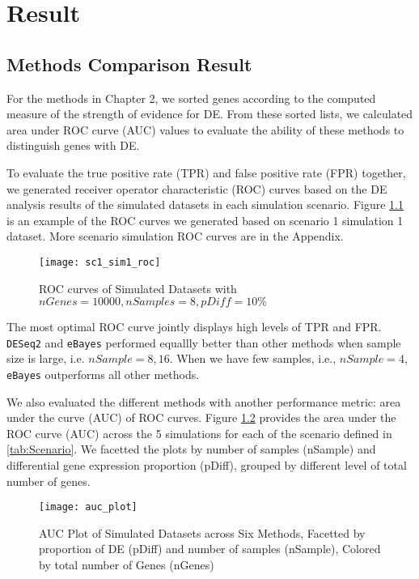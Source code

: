 \chapter{Result}

\section{Methods Comparison Result}

For the methods in Chapter 2, we sorted genes according to the computed measure of the strength of evidence for DE. From these sorted lists, we calculated area under ROC curve (AUC) values to evaluate the ability of these methods to distinguish genes with DE. 

To evaluate the true positive rate (TPR) and false positive rate (FPR) together, we generated receiver operator characteristic (ROC) curves based on the DE analysis results of the simulated datasets in each simulation scenario. Figure \ref{sc1_roc_01} is an example of the ROC curves we generated based on scenario 1 simulation 1 dataset. More scenario simulation ROC curves are in the Appendix. 

\begin{figure}[h!tb] 
\texttt{[image: sc1\_sim1\_roc]}
\caption{ROC curves of Simulated Datasets with $nGenes=10000, nSamples=8, pDiff=10\%$}
\label{sc1_roc_01}
\end{figure}

The most optimal ROC curve jointly displays high levels of TPR and FPR. {\tt DESeq2} and {\tt eBayes} performed equallly better than other methods when sample size is large, i.e. $nSample = 8, 16$. When we have few samples, i.e., $nSample=4$, {\tt eBayes} outperforms all other methods. 

We also evaluated the different methods with another performance metric: area under the curve (AUC) of ROC curves. Figure \ref{auc} provides the area under the ROC curve (AUC) across the 5 simulations for each of the scenario defined in \ref{tab:Scenario}. We facetted the plots by number of samples (nSample) and differential gene expression proportion (pDiff), grouped by different level of total number of genes. 

\begin{figure}[h!tb] 
\texttt{[image: auc\_plot]}
\caption{AUC Plot of Simulated Datasets across Six Methods, Facetted by proportion of DE (pDiff) and number of samples (nSample), Colored by total number of Genes (nGenes)}
\label{auc}
\end{figure}

